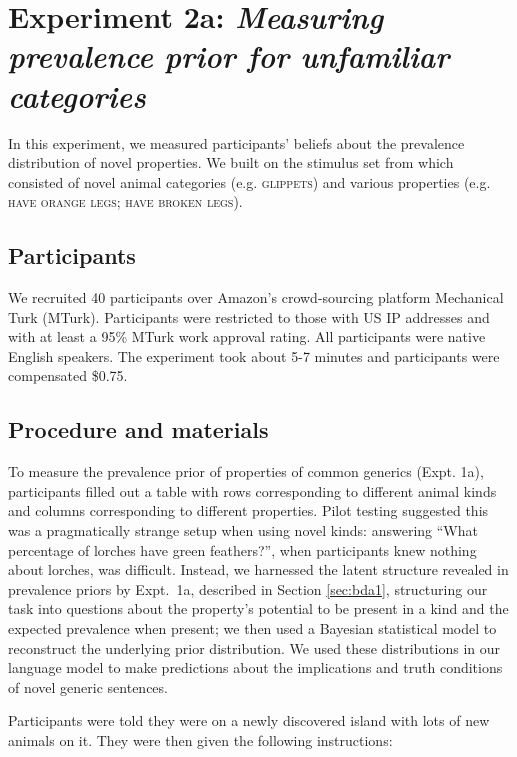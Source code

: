 \documentclass[10pt,letterpaper]{article}
\begin{document}
\section{Experiment 2a: \emph{Measuring prevalence prior for unfamiliar categories}}
\label{sec:prior2}

In this experiment, we measured participants' beliefs about the prevalence distribution of novel properties.
We built on the stimulus set from  which consisted of novel animal categories (e.g. \textsc{glippets}) and various properties (e.g. \textsc{have orange legs; have broken legs}).


\subsection{Participants}

We recruited 40 participants over Amazon's crowd-sourcing platform Mechanical Turk (MTurk).  
Participants were restricted to those with US IP addresses and with at least a 95\% MTurk work approval rating. 
All participants were native English speakers. 
The experiment took about 5-7 minutes and participants were compensated \$0.75.

\subsection{Procedure and materials}

To measure the prevalence prior of properties of common generics (Expt. 1a), participants filled out a table with rows corresponding to different animal kinds and columns corresponding to different properties. 
Pilot testing suggested this was a pragmatically strange setup when using novel kinds: answering ``What percentage of lorches have green feathers?'', when participants knew nothing about lorches, was difficult.
Instead, we harnessed the latent structure revealed in prevalence priors by Expt.~1a, described in Section \ref{sec:bda1}, structuring our task into questions about the property's potential to be present in a kind and the expected prevalence when present; we then used a Bayesian statistical model to reconstruct the underlying prior distribution. 
We used these distributions in our language model to make predictions about the implications and truth conditions of novel generic sentences.


Participants were told they were on a newly discovered island with lots of new animals on it. They were then given the following instructions:
\end{document}
